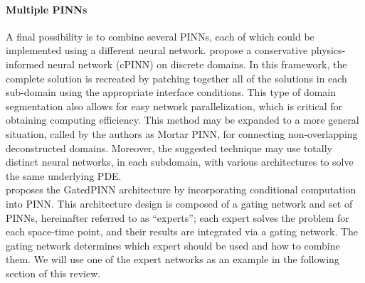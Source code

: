 \documentclass[pdflatex,sn-basic]{sn-jnl}%
\theoremstyle{thmstyleone}%
\theoremstyle{thmstyletwo}%
\theoremstyle{thmstylethree}%
\begin{document}
\paragraph{Multiple PINNs} 
A final possibility is to combine several PINNs, each of which could be implemented using a different neural network. 
\cite{Jag2020_ConservativePhysicsInformed_KhaJKK}
propose a conservative physics-informed neural network (cPINN) on discrete domains. In this framework, the complete solution is recreated by patching together all of the solutions in each sub-domain using the appropriate interface conditions. 
This type of domain segmentation also allows for easy network parallelization, which is critical for obtaining computing efficiency.
This method may be expanded to a more general situation, called by the authors as Mortar PINN, for connecting non-overlapping deconstructed domains.
Moreover, the suggested technique may use totally distinct neural networks, in each subdomain, with various architectures to solve the same underlying PDE.
\\
\noindent
\cite{Sti2020_LargeScaleNeural_BetSBB} proposes the GatedPINN architecture by incorporating conditional computation into PINN.
This architecture design is composed of a  gating network and set of PINNs, hereinafter referred to as ``experts''; each expert solves the problem for each space-time point, and their results are integrated via a gating network.
The gating network determines which expert should be used and how to combine them.
We will use one of the expert networks as an example in the following section of this review.
\end{document}
